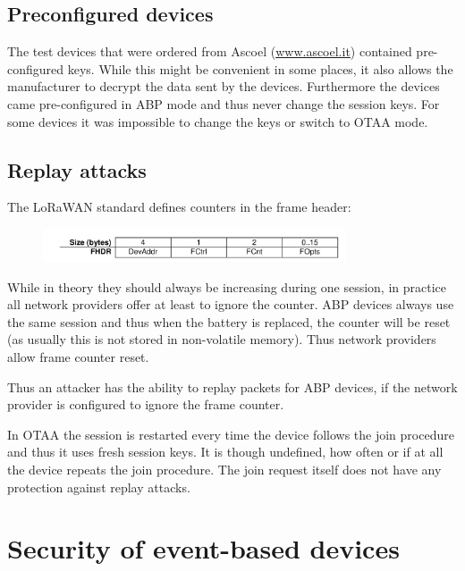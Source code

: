 \section{\texorpdfstring{{Preconfigured
devices}}{Preconfigured devices}}\label{h.7mkfizapvt5a}

{The test devices that were ordered from Ascoel
(\href{http://www.ascoel.it}{www.ascoel.it})
contained pre-configured keys. While this might be convenient in some
places, it also allows the manufacturer to decrypt the data sent by the
devices. Furthermore the devices came pre-configured in ABP mode and
thus never change the session keys. For some devices it was impossible
to change the keys or switch to OTAA mode.}

\section{\texorpdfstring{{Replay
attacks}}{Replay attacks}}\label{h.eymg8atzq5bp}


{The LoRaWAN standard defines counters in the frame header:}

\begin{figure}[h!]
{\includegraphics[width=0.8\textwidth]{images/image9.png}}
\end{figure}

{While in theory they should always be increasing during one session, in
practice all network providers offer at least to ignore the counter. ABP
devices always use the same session and thus when the battery is
replaced, the counter will be reset (as usually this is not stored in
non-volatile memory). Thus network providers allow frame counter reset.}

{Thus an attacker has the ability to replay packets for ABP devices, if
the network provider is configured to ignore the frame counter.}

{In OTAA the session is restarted every time the device follows the join
procedure and thus it uses fresh session keys. It is though undefined,
how often or if at all the device repeats the join procedure. The join
request itself does not have any protection against replay attacks.}

\hypertarget{h.1a3modh2fhpw}{\chapter{\texorpdfstring{{Security of
event-based
devices}}{Security of event-based devices}}\label{h.1a3modh2fhpw}}

